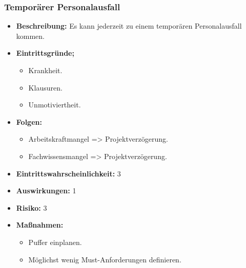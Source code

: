 \subsubsection{Temporärer Personalausfall}
\begin{itemize}
	\item \textbf{Beschreibung:} \newline
	Es kann jederzeit zu einem temporären Personalausfall kommen.
	\item \textbf{Eintrittsgründe;}
	\begin{itemize}
		\item Krankheit.
		\item Klausuren.
		\item Unmotiviertheit.
	\end{itemize}
	\item \textbf{Folgen:}
	\begin{itemize}
		\item Arbeitskraftmangel => Projektverzögerung.
		\item Fachwissensmangel => Projektverzögerung.
	\end{itemize}
	\item \textbf{Eintrittswahrscheinlichkeit:} 3
	\item \textbf{Auswirkungen:} 1
	\item \textbf{Risiko:} 3
	\item \textbf{Maßnahmen:}
	\begin{itemize}
		\item Puffer einplanen.
		\item Möglichst wenig Must-Anforderungen definieren.
	\end{itemize}
\end{itemize}
